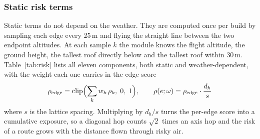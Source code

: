 \documentclass{ssnreview}
\begin{document}
\subsubsection{Static risk terms}

Static terms do not depend on the weather. They are computed once per build by sampling
each edge every 25\,m and flying the straight line between the two endpoint altitudes.
At each sample $k$ the module knows the flight altitude, the ground height, the tallest
roof directly below and the tallest roof within 30\,m. Table~\ref{tab:risk} lists all
eleven components, both static and weather-dependent, with the weight each one carries in
the edge score
\begin{equation}
  \rho_\mathrm{edge} = \operatorname{clip}\Bigl(\sum_k w_k\,\rho_k,\; 0,\; 1\Bigr), \qquad
  \rho(e;\omega) = \rho_\mathrm{edge}\cdot\frac{d_h}{s} \label{eq:risk}
\end{equation}
where $s$ is the lattice spacing. Multiplying by $d_h/s$ turns the per-edge score into a
cumulative exposure, so a diagonal hop counts $\sqrt{2}$ times an axis hop and the risk of
a route grows with the distance flown through risky air.
\end{document}
